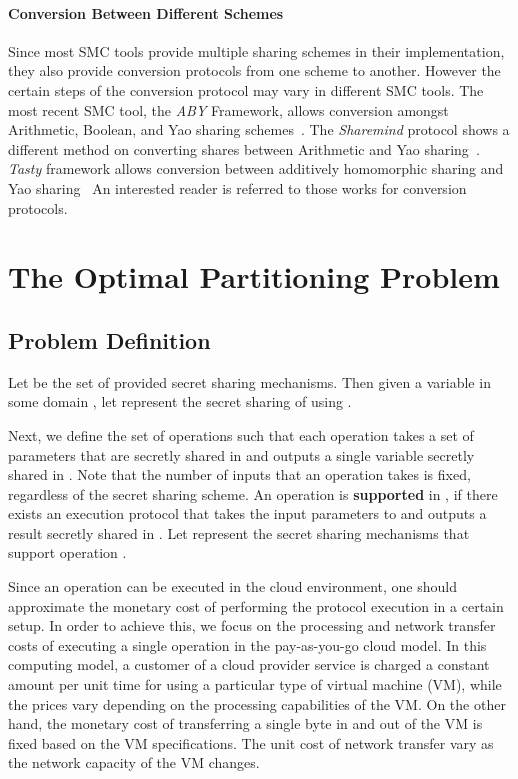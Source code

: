 \documentclass{llncs}
\begin{document}
\paragraph{Conversion Between Different Schemes} Since most SMC tools provide multiple sharing schemes in their implementation, they also provide conversion protocols from one scheme to another. However the certain steps of the conversion protocol may vary in different SMC tools. The most recent SMC tool, the \emph{ABY} Framework, allows conversion amongst Arithmetic, Boolean, and Yao sharing schemes~\cite{cite:demmler2015aby}. The \emph{Sharemind} protocol shows a different method on converting shares between Arithmetic and Yao sharing~\cite{cite:bogdanov2008sharemind}. \emph{Tasty} framework allows conversion between additively homomorphic sharing and Yao sharing~\cite{cite:henecka2010tasty} An interested reader is referred to those works for conversion protocols. 

\section{The Optimal Partitioning Problem}
\label{sec:problem}

\subsection{Problem Definition}
\label{sec:problem:definition}

Let  be the set of provided secret sharing mechanisms. Then given a variable  in some domain , let  represent the secret sharing of  using . 

Next, we define the set of operations  such that each operation  takes a set of parameters that are secretly shared in  and outputs a single variable secretly shared in . Note that the number of inputs that an operation takes is fixed, regardless of the secret sharing scheme. An operation  is \textbf{supported} in , if there exists an execution protocol that takes the input parameters to  and outputs a result secretly shared in . Let  represent the secret sharing mechanisms that support operation . 

Since an operation can be executed in the cloud environment, one should approximate the monetary cost of performing the protocol execution in a certain setup. In order to achieve this, we focus on the processing and network transfer costs of executing a single operation in the pay-as-you-go cloud model. In this computing model, a customer of a cloud provider service is charged a constant amount per unit time for using a particular type of virtual machine (VM), while the prices vary depending on the processing capabilities of the VM. On the other hand, the monetary cost of transferring a single byte in and out of the VM is fixed based on the VM specifications. The unit cost of network transfer vary as the network capacity of the VM changes.
\end{document}
